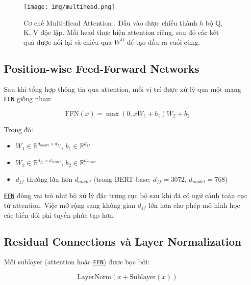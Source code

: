 \begin{figure}[H]
    \centering
    \texttt{[image: img/multihead.png]}
    \caption{Cơ chế Multi-Head Attention \cite{vaswani2017attention}. Đầu vào được chiếu thành $h$ bộ Q, K, V độc lập. Mỗi head thực hiện attention riêng, sau đó các kết quả được nối lại và chiếu qua $W^O$ để tạo đầu ra cuối cùng.}
    \label{fig:multi_head_attention}
\end{figure}

\subsection{Position-wise Feed-Forward Networks}
\label{ssec:feed_forward_networks}

Sau khi tổng hợp thông tin qua attention, mỗi vị trí được xử lý qua một mạng \hyperref[acro:ffn]{\texttt{FFN}} giống nhau:

\begin{equation}
\text{FFN}(x) = \max(0, xW_1 + b_1)W_2 + b_2
\label{eq:ffn}
\end{equation}

Trong đó:
\begin{itemize}
    \item $W_1 \in \mathbb{R}^{d_{model} \times d_{ff}}$, $b_1 \in \mathbb{R}^{d_{ff}}$
    \item $W_2 \in \mathbb{R}^{d_{ff} \times d_{model}}$, $b_2 \in \mathbb{R}^{d_{model}}$
    \item $d_{ff}$ thường lớn hơn $d_{model}$ (trong BERT-base: $d_{ff}=3072$, $d_{model}=768$)
\end{itemize}

\hyperref[acro:ffn]{\texttt{FFN}} đóng vai trò như bộ xử lý đặc trưng cục bộ sau khi đã có ngữ cảnh toàn cục từ attention. Việc mở rộng sang không gian $d_{ff}$ lớn hơn cho phép mô hình học các biến đổi phi tuyến phức tạp hơn.

\subsection{Residual Connections và Layer Normalization}
\label{ssec:residual_layer_norm}

Mỗi sublayer (attention hoặc \hyperref[acro:ffn]{\texttt{FFN}}) được bọc bởi:

\begin{equation}
\text{LayerNorm}(x + \text{Sublayer}(x))
\label{eq:residual_layernorm}
\end{equation}

